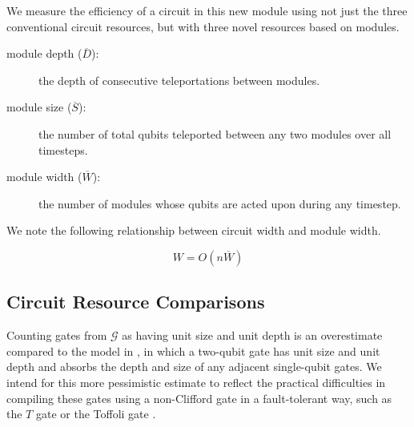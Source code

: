 \documentclass[twoside]{article}
\begin{document}
We measure the efficiency of a circuit in this new module using not just
the three conventional circuit resources, but with three novel resources
based on modules.

\begin{description}

\item[module depth ($\overline{D}$):] the depth of consecutive teleportations between modules.
\item[module size ($\overline{S}$):] the number of total qubits teleported between any two modules over all timesteps.
\item[module width ($\overline{W}$):] the number of modules whose qubits are
acted upon during any timestep.

\end{description}



We note the following relationship between circuit width and
module width.

\begin{equation}
W = O(n\overline{W})
\label{eqn:module-width}
\end{equation}

\subsection{Circuit Resource Comparisons}

Counting gates from $\mathcal{G}$ as having unit size and unit depth
is
an overestimate compared to the model in \cite{Kutin2006}, in which a
two-qubit gate has unit size and unit depth and
absorbs the depth and size of any adjacent single-qubit gates. We intend
for this more pessimistic estimate to reflect the practical difficulties
in compiling these gates using a non-Clifford gate in a fault-tolerant way,
such as the $T$ gate or the Toffoli gate
\cite{Fowler2011}.
\end{document}
